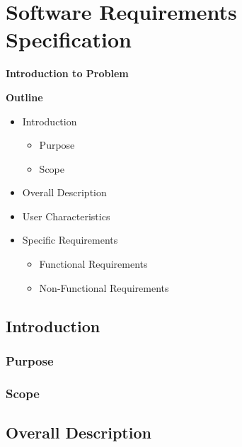 \section{Software Requirements Specification}

\vspace{20mm}

\Huge{\textbf{Introduction to Problem}}

\vspace{20mm}


\begin{abstract}
	\blindtext[2]
\end{abstract}

\vspace{20mm}

\large{\textbf{Outline}}

\begin{center}
	\begin{itemize}
		\item Introduction
		\begin{itemize}
            \item Purpose
            \item Scope
        \end{itemize}
		\item Overall Description
		\item User Characteristics
		\item Specific Requirements
        \begin{itemize}
            \item Functional Requirements
            \item Non-Functional Requirements
        \end{itemize}
	\end{itemize}
\end{center}
\pagebreak


\subsection{Introduction}
\blindtext[2]
    \subsubsection{Purpose}
    \blindtext[1]
    \subsubsection{Scope}
    \blindtext[1]

\subsection{Overall Description}
\blindtext[2]

